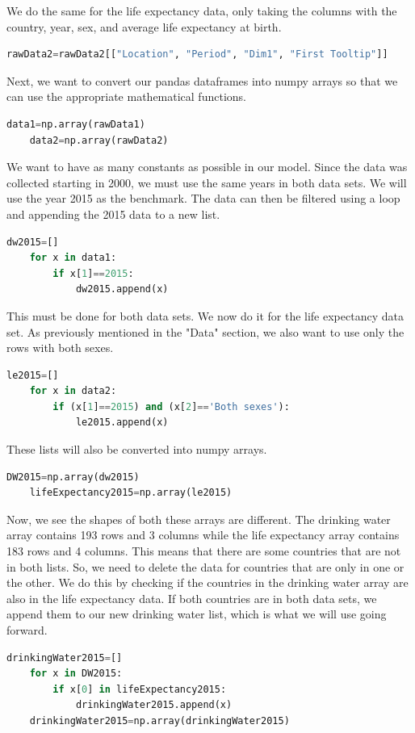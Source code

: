\documentclass[12pt]{article}
\begin{document}
We do the same for the life expectancy data, only taking the columns with the country, year, sex, and average life expectancy at birth.
\begin{lstlisting}[language=Python]
    rawData2=rawData2[["Location", "Period", "Dim1", "First Tooltip"]]
\end{lstlisting}

Next, we want to convert our pandas dataframes into numpy arrays so that we can use the appropriate mathematical functions.
\begin{lstlisting}[language=Python]
    data1=np.array(rawData1)
    data2=np.array(rawData2)
\end{lstlisting}

We want to have as many constants as possible in our model. Since the data was collected starting in 2000, we must use the same years in both data sets. We will use the year 2015 as the benchmark. The data can then be filtered using a loop and appending the 2015 data to a new list.
\begin{lstlisting}[language=Python]
    dw2015=[]
    for x in data1:
        if x[1]==2015:
            dw2015.append(x)
\end{lstlisting}

This must be done for both data sets. We now do it for the life expectancy data set. As previously mentioned in the "Data" section, we also want to use only the rows with both sexes.
\begin{lstlisting}[language=Python]
    le2015=[]
    for x in data2:
        if (x[1]==2015) and (x[2]=='Both sexes'):
            le2015.append(x)
\end{lstlisting}

These lists will also be converted into numpy arrays.
\begin{lstlisting}[language=Python]
    DW2015=np.array(dw2015)
    lifeExpectancy2015=np.array(le2015)
\end{lstlisting}

Now, we see the shapes of both these arrays are different. The drinking water array contains 193 rows and 3 columns while the life expectancy array contains 183 rows and 4 columns. This means that there are some countries that are not in both lists. So, we need to delete the data for countries that are only in one or the other. We do this by checking if the countries in the drinking water array are also in the life expectancy data. If both countries are in both data sets, we append them to our new drinking water list, which is what we will use going forward.
\begin{lstlisting}[language=Python]
    drinkingWater2015=[]
    for x in DW2015:
        if x[0] in lifeExpectancy2015:
            drinkingWater2015.append(x)
    drinkingWater2015=np.array(drinkingWater2015)
\end{lstlisting}
\end{document}
